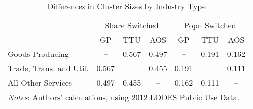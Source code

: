 
\begin{table}
\caption{Differences in Cluster Sizes by Industry Type }
\begin{tabular}{lcccccc}
\hline\hline
			& \multicolumn{3}{c}{Share Switched} & \multicolumn{3}{c}{Popn Switched} \\		
      		 & 	GP	& 	TTU & AOS 	& GP	& 	TTU & AOS	\\

Goods Producing 			&      --	& 	0.567  & 0.497  & --   & 0.191 & 0.162	\\
Trade, Trans. and Util. & 	0.567	&    --    &    0.455   & 0.191   & -- & 0.111\\
All Other Services		& 	0.497	&   0.455	& --	&  0.162  & 0.111& -- \\
\hline
\multicolumn{7}{l}{\footnotesize \textit{Notes}: Authors' calculations, using 2012 LODES Public Use Data.}\\
\end{tabular}
\end{table}
